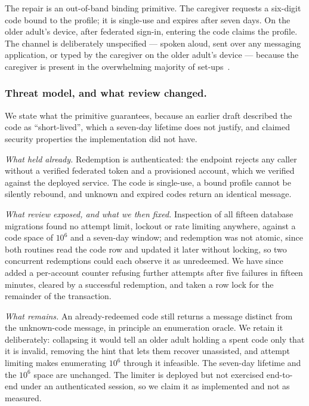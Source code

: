 \documentclass[runningheads,a4paper]{llncs}
\begin{document}
The repair is an out-of-band binding primitive. The caregiver requests a six-digit code
bound to the profile; it is single-use and expires after seven days. On the older adult's
device, after federated sign-in, entering the code claims the profile. The channel is
deliberately unspecified --- spoken aloud, sent over any messaging application, or typed by
the caregiver on the older adult's device --- because the caregiver is present in the
overwhelming majority of set-ups~\cite{quinn}.

\subsubsection{Threat model, and what review changed.}
We state what the primitive guarantees, because an earlier draft described the code as
``short-lived'', which a seven-day lifetime does not justify, and claimed security
properties the implementation did not have.

\emph{What held already.} Redemption is authenticated: the endpoint rejects any caller
without a verified federated token and a provisioned account, which we verified against the
deployed service. The code is single-use, a bound profile cannot be silently rebound, and
unknown and expired codes return an identical message.

\emph{What review exposed, and what we then fixed.} Inspection of all fifteen database
migrations found no attempt limit, lockout or rate limiting anywhere, against a code space
of $10^6$ and a seven-day window; and redemption was not atomic, since both routines read
the code row and updated it later without locking, so two concurrent redemptions could each
observe it as unredeemed. We have since added a per-account counter refusing further
attempts after five failures in fifteen minutes, cleared by a successful redemption, and
taken a row lock for the remainder of the transaction.

\emph{What remains.} An already-redeemed code still returns a message distinct from the
unknown-code message, in principle an enumeration oracle. We retain it deliberately:
collapsing it would tell an older adult holding a spent code only that it is invalid,
removing the hint that lets them recover unassisted, and attempt limiting makes enumerating
$10^6$ through it infeasible. The seven-day lifetime and the $10^6$ space are unchanged. The
limiter is deployed but not exercised end-to-end under an authenticated session, so we claim
it as implemented and not as measured.
\end{document}
